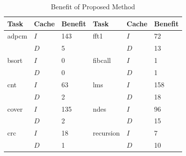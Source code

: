 \begin{table}[h!]
\small
\begin{minipage}{\linewidth}
\centering
    \begin{tabular}{l | l | l || l | l | l}
      Task & Cache & Benefit & Task & Cache & Benefit\\
      \hline

      adpcm & ${I}$ & 143 & fft1 & ${I}$ & 72 \\
            & ${D}$ & 5 & & ${D}$ & 13\\
      \hline

      bsort & ${I}$ & 0 & fibcall & ${I}$ & 1 \\
            & ${D}$ & 0 & & ${D}$ & 1 \\
      \hline

      cnt & ${I}$ & 63 & lms & ${I}$ & 158 \\
          & ${D}$ & 2 & & ${D}$ & 18 \\
      \hline

      cover & ${I}$ & 135 & ndes & ${I}$ & 96 \\
            & ${D}$ & 2 & & ${D}$ & 15 \\
      \hline

      crc & ${I}$ & 18 & recursion & ${I}$ & 7 \\
          & ${D}$ & 1 & & ${D}$ & 10  \\
      \hline

    \end{tabular}
    \bigskip
    \caption {Benefit of Proposed Method}
    \label{tab:proposed_method_benefit}
%
\end{minipage}
\normalsize
\vspace{-20pt}
\end{table}
%
%
%
%
